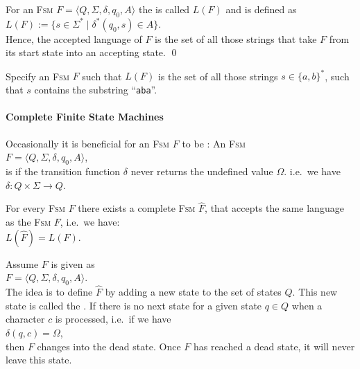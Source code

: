 \begin{Definition}
   
  For an \textsc{Fsm} $F = \langle Q, \Sigma, \delta, q_0, A \rangle$ the  
  is called $L(F)$ and is defined as
  \\[0.2cm]
  \hspace*{1.3cm}
  $L(F) := \bigl\{ s \in \Sigma^* \mid \delta^*(q_0,s) \in A \bigr\}$. 
  \\[0.2cm]
  Hence, the accepted language of $F$ is the set of all those strings that take $F$ from its
  start state into an accepting state. \qed
\end{Definition}

\exerciseEng
Specify an \textsc{Fsm} $F$ such that $L(F)$ is the set of all those strings $s \in \{a,b\}^*$, 
such that $s$ contains the substring  ``\texttt{aba}''.
\eox


\paragraph{Complete Finite State Machines}
Occasionally it is beneficial for an \textsc{Fsm} $F$ to be : An \textsc{Fsm}
\\[0.2cm]
\hspace*{1.3cm}
$F = \langle Q, \Sigma, \delta, q_0, A \rangle$,
\\[0.2cm]
is  if the transition function $\delta$ never returns the
undefined value $\Omega$. i.e.~we have 
\\[0.2cm]
\hspace*{1.3cm}
$\delta: Q \times \Sigma \rightarrow Q$.

\begin{Proposition}
  For every \textsc{Fsm} $F$ there exists a complete \textsc{Fsm}  $\widehat{F}$, that accepts
  the same language as the \textsc{Fsm}  $F$, i.e.~we have:
  \\[0.2cm]
  \hspace*{1.3cm}
  $L(\widehat{F}) = L(F)$.
\end{Proposition}

\proofEng
Assume $F$ is given as
\\[0.2cm]
\hspace*{1.3cm}
$F = \langle Q, \Sigma, \delta, q_0, A \rangle$.
\\[0.2cm]
The idea is to define $\widehat{F}$ by adding a new state to the set of states $Q$.  This new state is called
the  .  If there is no next state for a given state  $q \in Q$ when a character $c$
is processed, i.e.~if we have
\\[0.2cm]
\hspace*{1.3cm}
$\delta(q, c) = \Omega$,
\\[0.2cm]
then $F$ changes into the dead state.  Once $F$ has reached a dead state, it will never leave this
state.

